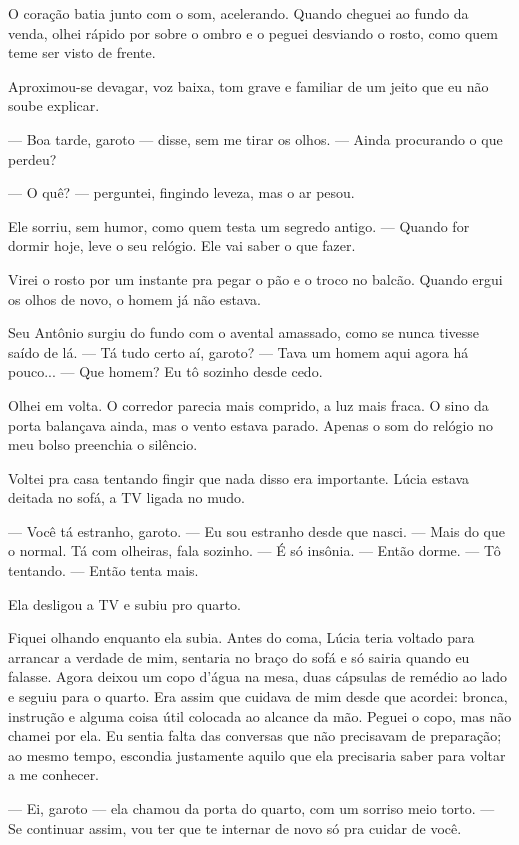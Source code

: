 O coração batia junto com o som, acelerando.  
Quando cheguei ao fundo da venda, olhei rápido por sobre o ombro e o peguei desviando o rosto, como quem teme ser visto de frente.  

Aproximou-se devagar, voz baixa, tom grave e familiar de um jeito que eu não soube explicar.

— Boa tarde, garoto — disse, sem me tirar os olhos. — Ainda procurando o que perdeu?

— O quê? — perguntei, fingindo leveza, mas o ar pesou.

Ele sorriu, sem humor, como quem testa um segredo antigo.  
— Quando for dormir hoje, leve o seu relógio. Ele vai saber o que fazer.

Virei o rosto por um instante pra pegar o pão e o troco no balcão.  
Quando ergui os olhos de novo, o homem já não estava.  

Seu Antônio surgiu do fundo com o avental amassado, como se nunca tivesse saído de lá.  
— Tá tudo certo aí, garoto?  
— Tava um homem aqui agora há pouco...  
— Que homem? Eu tô sozinho desde cedo.

Olhei em volta. O corredor parecia mais comprido, a luz mais fraca.  
O sino da porta balançava ainda, mas o vento estava parado.  
Apenas o som do relógio no meu bolso preenchia o silêncio.

\medskip

Voltei pra casa tentando fingir que nada disso era importante.  
Lúcia estava deitada no sofá, a TV ligada no mudo.

— Você tá estranho, garoto.  
— Eu sou estranho desde que nasci.  
— Mais do que o normal. Tá com olheiras, fala sozinho.  
— É só insônia.  
— Então dorme.  
— Tô tentando.  
— Então tenta mais.

Ela desligou a TV e subiu pro quarto.

\medskip

Fiquei olhando enquanto ela subia. Antes do coma, Lúcia teria voltado para arrancar a verdade de mim, sentaria no braço do sofá e só sairia quando eu falasse. Agora deixou um copo d'água na mesa, duas cápsulas de remédio ao lado e seguiu para o quarto. Era assim que cuidava de mim desde que acordei: bronca, instrução e alguma coisa útil colocada ao alcance da mão. Peguei o copo, mas não chamei por ela. Eu sentia falta das conversas que não precisavam de preparação; ao mesmo tempo, escondia justamente aquilo que ela precisaria saber para voltar a me conhecer.

— Ei, garoto — ela chamou da porta do quarto, com um sorriso meio torto. — Se continuar assim, vou ter que te internar de novo só pra cuidar de você.

